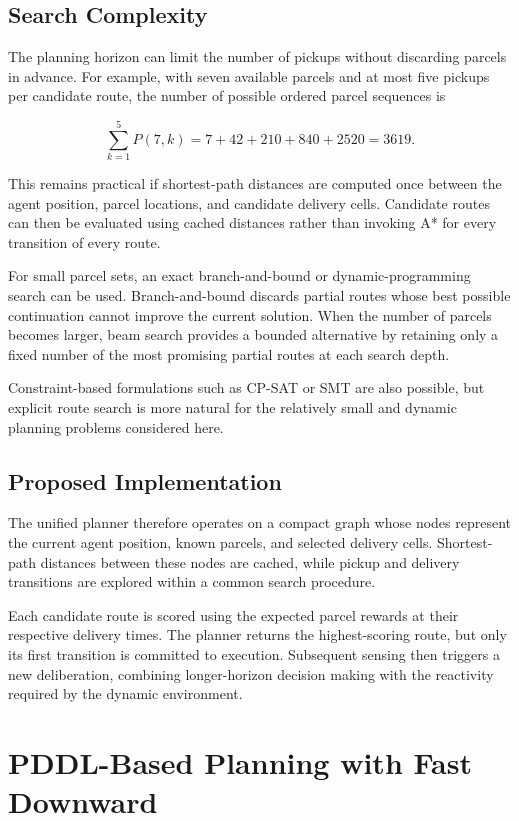 \documentclass[a4paper]{article}
\begin{document}
\subsection{Search Complexity}

The planning horizon can limit the number of pickups without discarding
parcels in advance. For example, with seven available parcels and at most five
pickups per candidate route, the number of possible ordered parcel sequences is

\[
    \sum_{k=1}^{5} P(7,k)
    = 7 + 42 + 210 + 840 + 2520
    = 3619.
\]

This remains practical if shortest-path distances are computed once between
the agent position, parcel locations, and candidate delivery cells. Candidate
routes can then be evaluated using cached distances rather than invoking A*
for every transition of every route.

For small parcel sets, an exact branch-and-bound or dynamic-programming search
can be used. Branch-and-bound discards partial routes whose best possible
continuation cannot improve the current solution. When the number of parcels
becomes larger, beam search provides a bounded alternative by retaining only a
fixed number of the most promising partial routes at each search depth.

Constraint-based formulations such as CP-SAT or SMT are also possible, but
explicit route search is more natural for the relatively small and dynamic
planning problems considered here.

\subsection{Proposed Implementation}

The unified planner therefore operates on a compact graph whose nodes represent
the current agent position, known parcels, and selected delivery cells.
Shortest-path distances between these nodes are cached, while pickup and
delivery transitions are explored within a common search procedure.

Each candidate route is scored using the expected parcel rewards at their
respective delivery times. The planner returns the highest-scoring route, but
only its first transition is committed to execution. Subsequent sensing then
triggers a new deliberation, combining longer-horizon decision making with the
reactivity required by the dynamic environment.

\section{PDDL-Based Planning with Fast Downward}
\label{sec:pddl-fast-downward}
\end{document}
